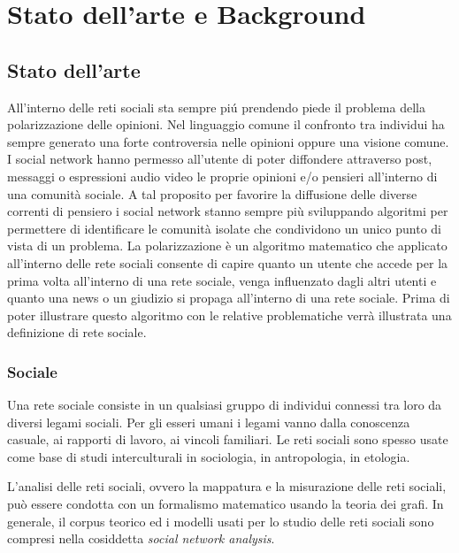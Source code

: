 \chapter{Stato dell'arte e Background}
\label{capitolo2}
 


\section{Stato dell'arte}
All'interno delle reti sociali sta sempre pi\'u prendendo piede il problema della polarizzazione delle opinioni. Nel linguaggio comune il confronto tra individui ha sempre generato una forte controversia nelle opinioni oppure una visione comune. 
I social network hanno permesso all'utente di poter diffondere attraverso post, messaggi o espressioni audio video le proprie opinioni e/o pensieri all'interno di una comunità sociale. A tal proposito per favorire la diffusione delle diverse correnti di pensiero i social network stanno sempre più sviluppando algoritmi per permettere di identificare le comunità isolate che condividono un unico punto di vista di un problema.
La polarizzazione è un algoritmo matematico che applicato all'interno delle rete sociali consente di capire quanto un utente che accede per la prima volta all'interno di una rete sociale, venga influenzato dagli altri utenti e quanto una news o un giudizio si propaga all'interno di una rete sociale.
Prima di poter illustrare questo algoritmo con le relative problematiche verrà illustrata una definizione di rete sociale.

\subsection{Sociale}
Una rete sociale consiste in un qualsiasi gruppo di individui connessi tra loro da diversi legami sociali. Per gli esseri umani i legami vanno dalla conoscenza casuale, ai rapporti di lavoro, ai vincoli familiari. Le reti sociali sono spesso usate come base di studi interculturali in sociologia, in antropologia, in etologia.

L'analisi delle reti sociali, ovvero la mappatura e la misurazione delle reti sociali, può essere condotta con un formalismo matematico usando la teoria dei grafi. In generale, il corpus teorico ed i modelli usati per lo studio delle reti sociali sono compresi nella cosiddetta \textit{social network analysis}.

